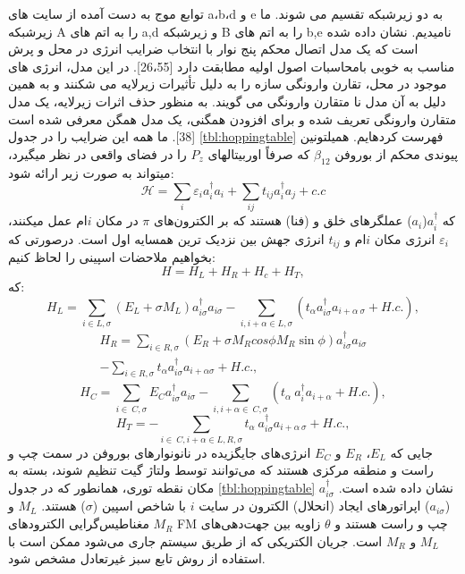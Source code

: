 توابع موج به دست آمده از سایت های a،b،d و e به دو زیرشبکه تقسیم می شوند. ما زیرشبکه A را به اتم های a,d و زیرشبکه B را به اتم های b,e نامیدیم. نشان داده شده است که یک مدل اتصال محکم پنج نوار با انتخاب ضرایب انرژی در محل و پرش مناسب به خوبی با\gls{محاسبات اصول اولیه} مطابقت دارد [26،55]. در این مدل، انرژی های موجود در محل، تقارن وارونگی سازه را به دلیل تأثیرات زیرلایه  می شکنند و به همین دلیل به آن مدل نا متقارن وارونگی  می گویند. به منظور حذف اثرات زیرلایه، یک مدل متقارن وارونگی  تعریف شده و برای افزودن همگنی، یک مدل همگن معرفی شده است [38]. ما همه این ضرایب را در جدول \ref{tbl:hoppingtable} فهرست کردهایم. همیلتونین پیوندی محکم از بوروفن $\beta_{12}$ که صرفاً اوربیتالهای $P_z$ را در فضای واقعی در نظر میگیرد، میتواند به صورت زیر ارائه شود:
\begin{equation}
  \mathcal{H}=\sum_{i}\varepsilon_i a_i^\dagger a_i +\sum_{ij} t_{ij}a_i^\dagger a_j+c.c
\end{equation}
که $a_i^\dagger$($a_i$) عملگرهای خلق و (فنا) هستند که بر الکترون‌های $\pi$ در مکان $i$ام عمل میکنند، $\varepsilon_i$ انرژی مکان $i$ام و $t_{ij}$ انرژی جهش بین نزدیک ترین همسایه اول است.
درصورتی که بخواهیم ملاحضات اسپینی را لحاظ کنیم:
\begin{equation}
  H= H_L + H_R + H_c + H_T,
\end{equation}
که:
\begin{equation}
H_{L}=\sum\limits_{i\in L,\sigma }{\left( E_{L}+\sigma M_{L} \right)} a_{i\sigma }^{\dagger} a_{i\sigma }-\sum\limits_{i,i+\alpha \in L,\sigma}{\left( t_{\alpha } a_{i\sigma}^{\dagger} a_{i+\alpha \ \sigma }+H.c.\right)},
\end{equation}
\begin{equation}
\begin{split}
H_{R}=\sum_{i\in R,\sigma}{\left( E_{R}+\sigma M_{R} cos\phi M_{R}\sin \phi\right)} a_{i\sigma}^{\dagger} a_{i\sigma } \\
-\sum_{i\in R,\sigma} t_{\alpha } a_{i\sigma}^{\dagger} a_{i+\alpha\sigma}+H.c.,
\end{split}
\end{equation}
\begin{equation}
H_{C}=\sum_{i\in \ C,\sigma }{{{E}_{C}}}a_{i\sigma }^{\dagger}{{a}_{i\sigma }}-\sum_{i,i+\alpha \in \ C,\sigma }{({{t}_{\alpha }}\ a_{i}^{\dagger }{{a}_{i+\alpha }}+H.c.)},
\end{equation}
\begin{equation}
H_{T}=-\sum_{i\in \ C,i+\alpha \in L,R,\sigma}{{{t}_{\alpha }}}\ a_{i\sigma }^{\dagger }{{a}_{i+\alpha \ \sigma }}+H.c.,
\end{equation}
جایی که $E_L$، $E_R$ و $E_C$ انرژی‌های جایگزیده در نانونوارهای بوروفن در سمت چپ و راست و منطقه مرکزی هستند که می‌توانند توسط ولتاژ گیت تنظیم شوند، بسته به مکان نقطه توری، همانطور که در جدول \ref{tbl:hoppingtable} نشان داده شده است. $a^{\dagger}_{i\sigma}$ ($a_{i\sigma}$) اپراتورهای ایجاد (انحلال) الکترون در سایت $i$ با شاخص اسپین ($\sigma$) هستند. $M_L$ و $M_R$ مغناطیس‌گرایی الکترودهای FM چپ و راست هستند و $\theta$ زاویه بین جهت‌دهی‌های $M_L$ و $M_R$ است. جریان الکتریکی که از طریق سیستم جاری می‌شود ممکن است با استفاده از روش تابع سبز غیرتعادل مشخص شود.


